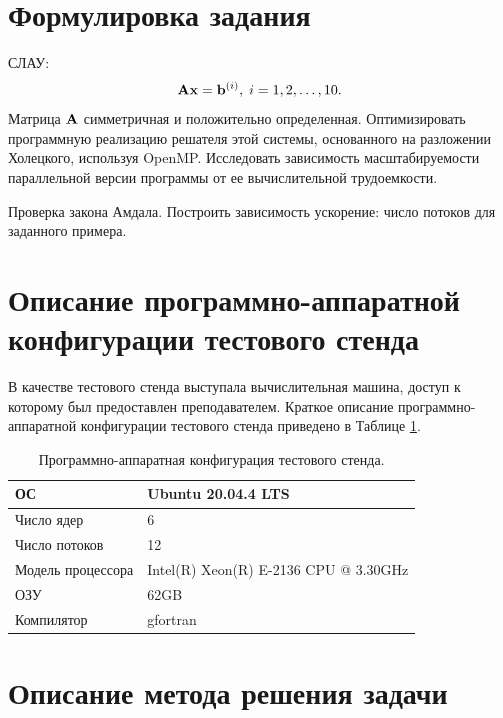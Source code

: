 \documentclass[12pt]{article}
\begin{document}

\setcounter{page}{2}

\tableofcontents
\newpage

\section*{Формулировка задания}

СЛАУ:
\begin{equation}
    \label{eq:1}
    \vb{A} \vb{x} = \vb{b}^{(i)},\; i=1,2,\ldots,10.
\end{equation}
Матрица $\vb{A}$ симметричная и положительно определенная. Оптимизировать программную реализацию решателя этой системы, основанного на разложении Холецкого, используя OpenMP. Исследовать зависимость масштабируемости параллельной версии программы от ее вычислительной трудоемкости.

Проверка закона Амдала. Построить зависимость ускорение: число потоков для заданного примера.

\section{Описание программно-аппаратной конфигурации тестового стенда}

В качестве тестового стенда выступала вычислительная машина, доступ к которому был предоставлен преподавателем. Краткое описание программно-аппаратной конфигурации тестового стенда приведено в Таблице \ref{tab:1}.
\begin{table}[!ht]
    \centering
    \begin{tabular}{|l|l|}
    \hline
        ОС & Ubuntu 20.04.4 LTS \\ \hline
        Число ядер & 6 \\ \hline
        Число потоков & 12 \\ \hline
        Модель процессора & Intel(R) Xeon(R) E-2136 CPU @ 3.30GHz \\ \hline
        ОЗУ & 62GB \\ \hline
        Компилятор & gfortran \\ \hline
    \end{tabular}
    \caption{Программно-аппаратная конфигурация тестового стенда.}
    \label{tab:1}
\end{table}

\section{Описание метода решения задачи}
\end{document}
